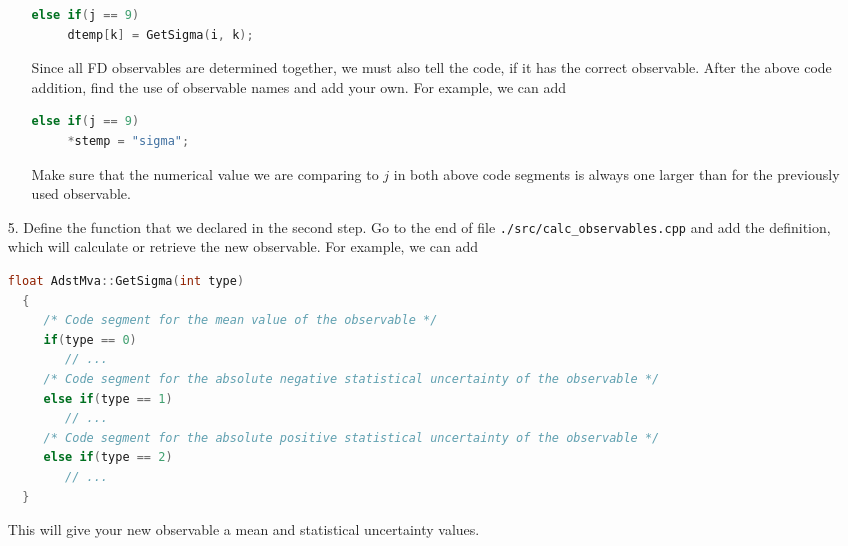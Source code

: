 \documentclass[12pt,a4paper]{report}
\begin{document}
\begin{itemize}
\begin{itemize}
\begin{lstlisting}[language=C++]
  else if(j == 9)
     dtemp[k] = GetSigma(i, k);
\end{lstlisting}
Since all FD observables are determined together, we must also tell the code, if it has the correct observable. After the above code addition, find the use of observable names and add your own. For example, we can add
\begin{lstlisting}[language=C++]
  else if(j == 9)
     *stemp = "sigma";
\end{lstlisting}
Make sure that the numerical value we are comparing to $j$ in both above code segments is always one larger than for the previously used observable.
\end{itemize}
\item[5.] Define the function that we declared in the second step. Go to the end of file \texttt{./src/calc\_observables.cpp} and add the definition, which will calculate or retrieve the new observable. For example, we can add
\begin{lstlisting}[language=C++]
  float AdstMva::GetSigma(int type)
  {
     /* Code segment for the mean value of the observable */
     if(type == 0)
        // ...
     /* Code segment for the absolute negative statistical uncertainty of the observable */
     else if(type == 1)
        // ...
     /* Code segment for the absolute positive statistical uncertainty of the observable */
     else if(type == 2)
        // ...
  }
\end{lstlisting}
This will give your new observable a mean and statistical uncertainty values.
\end{itemize}
\end{document}
